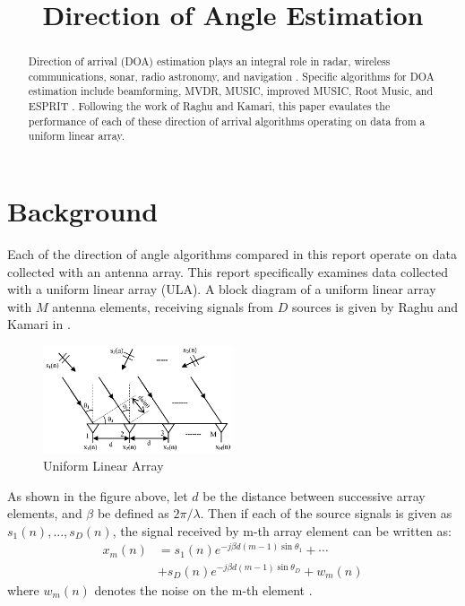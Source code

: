 \documentclass[conference]{IEEEtran}
\begin{document}
\title{Direction of Angle Estimation}

\author{
}
\maketitle

\begin{abstract}
	Direction of arrival (DOA) estimation plays an integral role in radar, wireless communications, sonar, radio astronomy, and navigation \cite{doa_algorithms_raghu}. Specific algorithms for DOA estimation include beamforming, MVDR, MUSIC, improved MUSIC, Root Music, and ESPRIT \cite{doa_algorithms_raghu}. Following the work of Raghu and Kamari, this paper evaulates the performance of each of these direction of arrival algorithms operating on data from a uniform linear array. 
\end{abstract}

	\section{Background}
	
	Each of the direction of angle algorithms compared in this report operate on data collected with an antenna array. This report specifically examines data collected with a uniform linear array (ULA). A block diagram of a uniform linear array with $M$ antenna elements, receiving signals from $D$ sources is given by Raghu and Kamari in \cite{doa_algorithms_raghu}.
	
	\begin{figure}[H]
		\centerline{\includegraphics[width=0.5\textwidth]{uniform_linear_array.png}}
		\caption{Uniform Linear Array \cite{doa_algorithms_raghu}}
	\end{figure}
	
	As shown in the figure above, let $d$ be the distance between successive array elements, and $\beta$ be defined as $2\pi/\lambda$. Then if each of the source signals is given as $s_1(n),...,s_D(n)$, the signal received by m-th array element can be written as:
	\begin{equation}
		\label{received_signal}
		\begin{split}
			x_m(n) &= s_1(n)e^{-j{\beta}d(m-1)\sin{\theta_1}} + \cdots\\
			&+ s_D(n)e^{-j{\beta}d(m-1)\sin{\theta_D}} + w_m(n)
		\end{split}
	\end{equation}
	where $w_m(n)$ denotes the noise on the m-th element \cite{doa_algorithms_raghu}.
	
\end{document}
